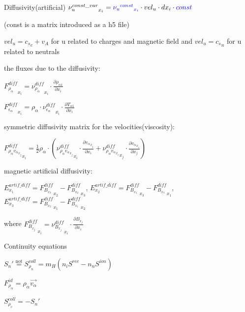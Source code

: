 \documentclass{beamer}
\begin{document}
\begin{frame}{Diffusivity(artificial)}
${\nu_u^{const\_var}}_{x_i}  = \textcolor{blue}{{{\nu_u}^{const}}_{x_i}} \cdot  vel_u \cdot  dx_i \cdot  \textcolor{blue}{const}$ 

(const is a matrix introduced as a h5 file)

$vel_u =  {c_s}_c + v_A$ for u  related to charges and magnetic field and 
$vel_u =  {c_s}_n $ for u  related to neutrals

the fluxes due to the diffusivity:

${F_{\rho_\alpha}^{diff}}_{x_i} =  {\nu_{\rho_\alpha}^{diff}}_{x_i} \cdot \frac{\partial \rho_{\alpha1}}{\partial x_i}$

${F_{\epsilon_\alpha}^{diff}}_{x_i} =  \rho_\alpha \cdot {\nu_{\epsilon_\alpha}^{diff}}_{x_i} \cdot \frac{\partial T_{\alpha1}}{\partial x_i}$


symmetric diffusivity matrix for the velocities(viscosity):

${F_{\rho_\alpha{v_\alpha}_{x_j}}^{diff}}_{x_i}  = \frac{1}{2} \rho_\alpha \cdot ({\nu_{\rho_\alpha{v_\alpha}_{x_j}}^{diff}}_{x_i} \cdot \frac{\partial {v_\alpha}_{x_j}}{\partial x_i} +  {\nu_{\rho_\alpha{v_\alpha}_{x_i}}^{diff}}_{x_j} \cdot \frac{\partial {v_\alpha}_{x_i}}{\partial x_j} )$

magnetic artificial diffusivity:

$E^{artif\_diff}_{x_1} = {F_{B_{x_3}}^{diff}}_{x_2} - {F_{B_{x_2}}^{diff}}_{x_3}   $,  
$E^{artif\_diff}_{x_2} = {F_{B_{x_1}}^{diff}}_{x_3} - {F_{B_{x_3}}^{diff}}_{x_1}   $,  
$E^{artif\_diff}_{x_3} = {F_{B_{x_2}}^{diff}}_{x_1} - {F_{B_{x_1}}^{diff}}_{x_2}   $  

where 
${F_{B_{x_j}}^{diff}}_{x_i} =  {\nu_{B_{x_j}}^{diff}}_{x_i} \cdot \frac{\partial B_{x_j}}{\partial x_i}$

\end{frame}
\begin{frame}{Continuity equations}

$S_n' \stackrel{\text{not}}{=} S_{\rho_n}^{coll} = m_H (n_i S^{rec} - n_n S^{ion} )$

$F_{\rho_{\alpha}}^{id} = \rho_\alpha \vec{v_\alpha} $

$S_{\rho_c}^{coll} = -S_n'$

\end{frame}
\end{document}
